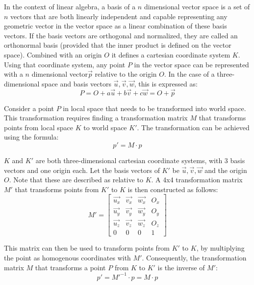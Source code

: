 In the context of linear algebra,
a basis of a $n$ dimensional vector space is a set of $n$ vectors that are both linearly independent
and capable representing any geometric vector in the vector space as a linear combination of these basis vectors.
If the basis vectors are orthogonal and normalized,
they are called an orthonormal basis (provided that the inner product is defined on the vector space).
Combined with an origin $O$ it defines a cartesian coordinate system $K$.
Using that coordinate system, any point $P$ in the vector space can be represented with a $n$ dimensional
vector$\vec{p}$ relative to the origin $O$.
In the case of a three-dimensional space and basis vectors $\vec{u}, \vec{v}, \vec{w}$, this is expressed as:
\begin{equation}
    P = O + a\vec{u} + b\vec{v} + c\vec{w} = O + \vec{p}
\end{equation}

Consider a point $P$ in local space that needs to be transformed into world space.
This transformation requires finding a transformation matrix $M$ that transforms points
from local space $K$ to world space $K'$.
The transformation can be achieved using the formula:
\begin{equation}
    p' = M\cdot p
\end{equation}

$K$ and $K'$ are both three-dimensional cartesian coordinate systems, with 3 basis vectors and one origin each.
Let the basis vectors of $K'$ be $\vec{u}, \vec{v}, \vec{w}$ and the origin $O$.
Note that these are described as relative to $K$.
A 4x4 transformation matrix $M'$ that transforms points from $K'$ to $K$ is then constructed as follows:
\begin{equation}
    M' = \begin{bmatrix}
            \vec{u_x} & \vec{v_x} & \vec{w_x} & O_x \\
            \vec{u_y} & \vec{v_y} & \vec{w_y} & O_y \\
            \vec{u_z} & \vec{v_z} & \vec{w_z} & O_z \\
            0         & 0         & 0         & 1
    \end{bmatrix}
\end{equation}

This matrix can then be used to transform points from $K'$ to $K$, by multiplying the point as homogenous coordinates with $M'$.
Consequently, the transformation matrix $M$ that transforms a point $P$ from $K$ to $K'$ is the inverse of $M'$:
\begin{equation}
    p' = M'^{-1} \cdot p = M\cdot p
\end{equation}

